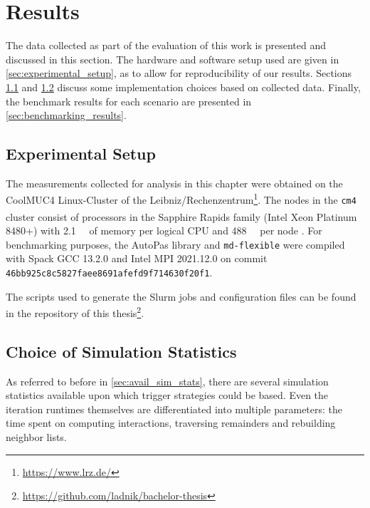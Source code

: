 \chapter[Results]{Results}
\label{cp:results}

{
	\parindent0pt
	The data collected as part of the evaluation of this work is presented and discussed in this section. The hardware and software setup used are given in \autoref{sec:experimental_setup}, as to allow for reproducibility of our results. Sections \ref{sec:experimental_setup} and \ref{sec:justification_rebuild} discuss some implementation choices based on collected data. Finally, the benchmark results for each scenario are presented in \autoref{sec:benchmarking_results}.
}

\section{Experimental Setup}
\label{sec:experimental_setup}
The measurements collected for analysis in this chapter were obtained on the CoolMUC4 Linux-Cluster of the Leibniz\-/Rechenzentrum\footnote{\href{https://www.lrz.de/}{https://www.lrz.de/}}. The nodes in the \texttt{cm4} cluster consist of processors in the Sapphire Rapids family (Intel\textsuperscript{\textregistered} Xeon\textsuperscript{\textregistered} Platinum 8480+)  with \qty{2.1}{\gibi \byte} of memory per logical CPU and \qty{488}{\gibi \byte} per node \cite{LSC2025}. For benchmarking purposes, the AutoPas library and \texttt{md-flexible} were compiled with  Spack GCC 13.2.0 and Intel MPI 2021.12.0 on commit \texttt{46bb925c8c5827faee8691afefd9f714630f20f1}.

The scripts used to generate the Slurm jobs and configuration files can be found in the repository of this thesis\footnote{\href{https://github.com/ladnik/bachelor-thesis}{https://github.com/ladnik/bachelor-thesis}}.


\section{Choice of Simulation Statistics}
\label{sec:justification_rebuild}
As referred to before in \autoref{sec:avail_sim_stats}, there are several simulation statistics available upon which trigger strategies could be based. Even the iteration runtimes themselves are differentiated into multiple parameters: the time spent on computing interactions, traversing remainders and rebuilding neighbor lists.

